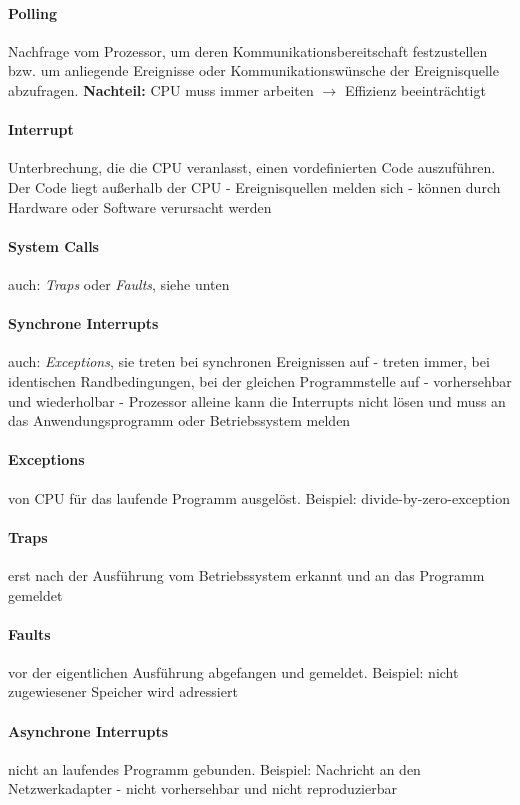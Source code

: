 \documentclass[10pt,a4paper,landscape]{article}
\begin{document}
\begin{multicols*}{3}
	\paragraph{Polling} Nachfrage vom Prozessor, um deren Kommunikationsbereitschaft festzustellen bzw. um anliegende Ereignisse oder Kommunikationswünsche der Ereignisquelle abzufragen. \textbf{Nachteil:} CPU muss immer arbeiten $\rightarrow$ Effizienz beeinträchtigt
	\paragraph{Interrupt} Unterbrechung, die die CPU veranlasst, einen vordefinierten Code auszuführen. Der Code liegt außerhalb der CPU - Ereignisquellen melden sich - können durch Hardware oder Software verursacht werden
	\paragraph{System Calls} auch: \textit{Traps} oder \textit{Faults}, siehe unten
	\paragraph{Synchrone Interrupts} auch: \textit{Exceptions}, sie treten bei synchronen Ereignissen auf - treten immer, bei identischen Randbedingungen, bei der gleichen Programmstelle auf - vorhersehbar und wiederholbar - Prozessor alleine kann die Interrupts nicht lösen und muss an das Anwendungsprogramm oder Betriebssystem melden
	\paragraph{Exceptions} von CPU für das laufende Programm ausgelöst. Beispiel: divide-by-zero-exception
	\paragraph{Traps} erst nach der Ausführung vom Betriebssystem erkannt und an das Programm gemeldet
	\paragraph{Faults} vor der eigentlichen Ausführung abgefangen und gemeldet. Beispiel: nicht zugewiesener Speicher wird adressiert
	\paragraph{Asynchrone Interrupts} nicht an laufendes Programm gebunden. Beispiel: Nachricht an den Netzwerkadapter - nicht vorhersehbar und nicht reproduzierbar

\end{multicols*}
\end{document}
